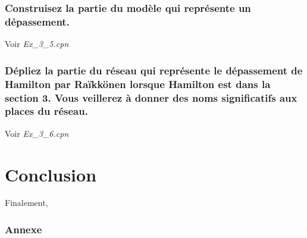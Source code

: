 \documentclass[french]{article}
\begin{document}
\subsubsection{Construisez la partie du modèle qui
  représente un dépassement.}
Voir \textit{Ex\_3\_5.cpn} \\
\subsubsection{Dépliez la partie du réseau qui représente le dépassement de Hamilton par Raïkkönen lorsque Hamilton est dans
  la section 3. Vous veillerez à donner des noms significatifs aux places du réseau.}
Voir \textit{Ex\_3\_6.cpn} \\
\section{Conclusion}
Finalement,

\newpage
\subsubsection{Annexe}

\end{document}
